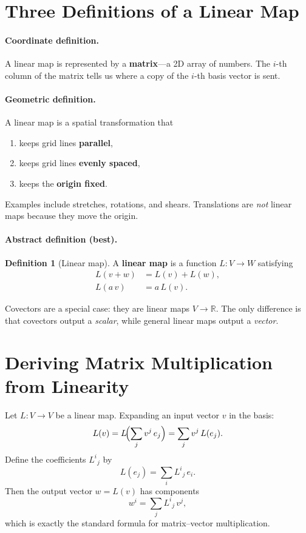 \documentclass[12pt, a4paper]{report}
\theoremstyle{definition}
\newtheorem{definition}{Definition}[chapter]
\theoremstyle{plain}
\theoremstyle{remark}
\newcommand{\R}{\mathbb{R}}
\begin{document}
\section{Three Definitions of a Linear Map}

\paragraph{Coordinate definition.}
A linear map is represented by a \textbf{matrix}---a 2D array of numbers.  The
$i$-th column of the matrix tells us where a copy of the $i$-th basis vector is
sent.

\paragraph{Geometric definition.}
A linear map is a spatial transformation that
\begin{enumerate}[nosep]
    \item keeps grid lines \textbf{parallel},
    \item keeps grid lines \textbf{evenly spaced},
    \item keeps the \textbf{origin fixed}.
\end{enumerate}
Examples include stretches, rotations, and shears.  Translations are
\emph{not} linear maps because they move the origin.

\paragraph{Abstract definition (best).}
\begin{definition}[Linear map]
A \textbf{linear map} is a function $L : V \to W$ satisfying
\begin{align}
    L(v + w) &= L(v) + L(w), \label{eq:lm-add}\\
    L(a\,v)  &= a\,L(v). \label{eq:lm-scale}
\end{align}
\end{definition}
Covectors are a special case: they are linear maps $V \to \R$.  The only
difference is that covectors output a \emph{scalar}, while general linear maps
output a \emph{vector}.

\section{Deriving Matrix Multiplication from Linearity}

Let $L : V \to V$ be a linear map.  Expanding an input vector $v$ in the basis:
\[
    L(v) = L\!\Bigl(\sum_j v^{j}\,e_j\Bigr)
         = \sum_j v^{j}\,L(e_j).
\]
Define the coefficients $L^{i}{}_{j}$ by
\[
    L(e_j) = \sum_i L^{i}{}_{j}\, e_i.
\]
Then the output vector $w = L(v)$ has components
\begin{equation}\label{eq:mat-mult}
    \boxed{w^{i} = \sum_j L^{i}{}_{j}\, v^{j},}
\end{equation}
which is exactly the standard formula for matrix--vector multiplication.
\end{document}

